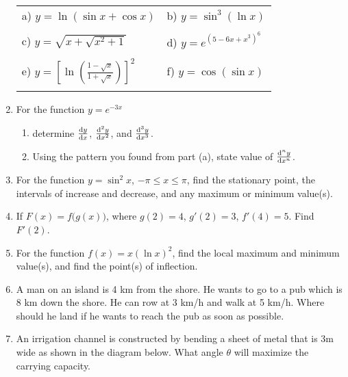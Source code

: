 \documentclass{article}
\begin{document}
\begin{enumerate}
\begin{tabular}{ll}
a) $y=\ln (\sin x + \cos x)$ \hspace{3cm} & b) $y=\sin^3(\ln x)$ \\
\vspace{4cm} & \\
c) $y=\sqrt{x+\sqrt{x^2+1}}$ & d) $y=e^{(5-6x+x^3)^6}$ \\
\vspace{4cm} & \\
e) $y=\left[\ln\left(\frac{1-\sqrt x}{1+\sqrt x}\right)\right]^2$ &
f) $y=\cos(\sin x)$ \\
\vspace{4cm} & \\
\end{tabular}
\item For the function $y=e^{-3x}$
\begin{enumerate}
\item determine $\frac{\mathrm d y}{\mathrm d x}$, $\frac{\mathrm d^2 y}{\mathrm d x^2}$,
and $\frac{\mathrm d^3 y}{\mathrm d x^3}$.
\vspace{2cm}
\item Using the pattern you found from part (a), state value of
$\frac{\mathrm d^n y}{\mathrm d x^n}$.
\end{enumerate}
\vspace{4.5cm}
\item For the function $y=\sin^2 x$, $-\pi\le x\le\pi$, find the
stationary point, the intervals of increase and decrease, and any maximum
or minimum value(s).
\vspace{9cm}
\item If $F(x)=f\big(g(x)\big)$, where $g(2)=4$, $g'(2)=3$, $f'(4)=5$.
Find $F'(2)$.
\vspace{9cm}
\item For the function $f(x)=x(\ln x)^2$, find the local
maximum and minimum value(s), and find the point(s) of inflection.
\vspace{9cm}
\item A man on an island is 4 km from the shore. He wants to go to
a pub which is 8 km down the shore. He can row at 3 km/h and walk at
5 km/h. Where should he land if he wants to reach the pub as soon as
possible.
\vspace{9cm}
\item An irrigation channel is constructed by bending a sheet of metal
that is 3m wide as shown in the diagram below. What angle $\theta$ will
maximize the carrying capacity.


\end{enumerate}
\end{document}

